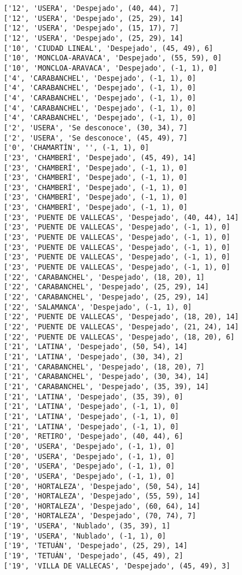 \documentclass[11pt]{article}
\begin{document}
\begin{Verbatim}[commandchars=\\\{\}]
['12', 'USERA', 'Despejado', (40, 44), 7]
['12', 'USERA', 'Despejado', (25, 29), 14]
['12', 'USERA', 'Despejado', (15, 17), 7]
['12', 'USERA', 'Despejado', (25, 29), 14]
['10', 'CIUDAD LINEAL', 'Despejado', (45, 49), 6]
['10', 'MONCLOA-ARAVACA', 'Despejado', (55, 59), 0]
['10', 'MONCLOA-ARAVACA', 'Despejado', (-1, 1), 0]
['4', 'CARABANCHEL', 'Despejado', (-1, 1), 0]
['4', 'CARABANCHEL', 'Despejado', (-1, 1), 0]
['4', 'CARABANCHEL', 'Despejado', (-1, 1), 0]
['4', 'CARABANCHEL', 'Despejado', (-1, 1), 0]
['4', 'CARABANCHEL', 'Despejado', (-1, 1), 0]
['2', 'USERA', 'Se desconoce', (30, 34), 7]
['2', 'USERA', 'Se desconoce', (45, 49), 7]
['0', 'CHAMARTÍN', '', (-1, 1), 0]
['23', 'CHAMBERÍ', 'Despejado', (45, 49), 14]
['23', 'CHAMBERÍ', 'Despejado', (-1, 1), 0]
['23', 'CHAMBERÍ', 'Despejado', (-1, 1), 0]
['23', 'CHAMBERÍ', 'Despejado', (-1, 1), 0]
['23', 'CHAMBERÍ', 'Despejado', (-1, 1), 0]
['23', 'CHAMBERÍ', 'Despejado', (-1, 1), 0]
['23', 'PUENTE DE VALLECAS', 'Despejado', (40, 44), 14]
['23', 'PUENTE DE VALLECAS', 'Despejado', (-1, 1), 0]
['23', 'PUENTE DE VALLECAS', 'Despejado', (-1, 1), 0]
['23', 'PUENTE DE VALLECAS', 'Despejado', (-1, 1), 0]
['23', 'PUENTE DE VALLECAS', 'Despejado', (-1, 1), 0]
['23', 'PUENTE DE VALLECAS', 'Despejado', (-1, 1), 0]
['22', 'CARABANCHEL', 'Despejado', (18, 20), 1]
['22', 'CARABANCHEL', 'Despejado', (25, 29), 14]
['22', 'CARABANCHEL', 'Despejado', (25, 29), 14]
['22', 'SALAMANCA', 'Despejado', (-1, 1), 0]
['22', 'PUENTE DE VALLECAS', 'Despejado', (18, 20), 14]
['22', 'PUENTE DE VALLECAS', 'Despejado', (21, 24), 14]
['22', 'PUENTE DE VALLECAS', 'Despejado', (18, 20), 6]
['21', 'LATINA', 'Despejado', (50, 54), 14]
['21', 'LATINA', 'Despejado', (30, 34), 2]
['21', 'CARABANCHEL', 'Despejado', (18, 20), 7]
['21', 'CARABANCHEL', 'Despejado', (30, 34), 14]
['21', 'CARABANCHEL', 'Despejado', (35, 39), 14]
['21', 'LATINA', 'Despejado', (35, 39), 0]
['21', 'LATINA', 'Despejado', (-1, 1), 0]
['21', 'LATINA', 'Despejado', (-1, 1), 0]
['21', 'LATINA', 'Despejado', (-1, 1), 0]
['20', 'RETIRO', 'Despejado', (40, 44), 6]
['20', 'USERA', 'Despejado', (-1, 1), 0]
['20', 'USERA', 'Despejado', (-1, 1), 0]
['20', 'USERA', 'Despejado', (-1, 1), 0]
['20', 'USERA', 'Despejado', (-1, 1), 0]
['20', 'HORTALEZA', 'Despejado', (50, 54), 14]
['20', 'HORTALEZA', 'Despejado', (55, 59), 14]
['20', 'HORTALEZA', 'Despejado', (60, 64), 14]
['20', 'HORTALEZA', 'Despejado', (70, 74), 7]
['19', 'USERA', 'Nublado', (35, 39), 1]
['19', 'USERA', 'Nublado', (-1, 1), 0]
['19', 'TETUÁN', 'Despejado', (25, 29), 14]
['19', 'TETUÁN', 'Despejado', (45, 49), 2]
['19', 'VILLA DE VALLECAS', 'Despejado', (45, 49), 3]

\end{Verbatim}
\end{document}
